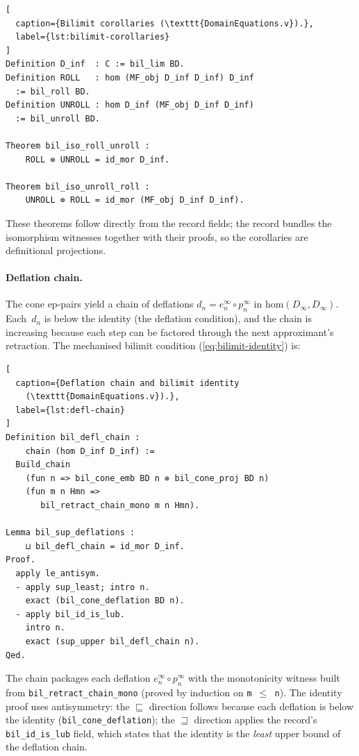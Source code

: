\begin{lstlisting}[
  caption={Bilimit corollaries (\texttt{DomainEquations.v}).},
  label={lst:bilimit-corollaries}
]
Definition D_inf  : C := bil_lim BD.
Definition ROLL   : hom (MF_obj D_inf D_inf) D_inf
  := bil_roll BD.
Definition UNROLL : hom D_inf (MF_obj D_inf D_inf)
  := bil_unroll BD.

Theorem bil_iso_roll_unroll :
    ROLL ⊚ UNROLL = id_mor D_inf.

Theorem bil_iso_unroll_roll :
    UNROLL ⊚ ROLL = id_mor (MF_obj D_inf D_inf).
\end{lstlisting}

These theorems follow directly from the record fields; the record
bundles the isomorphism witnesses together with their proofs,
so the corollaries are definitional projections.

\paragraph{Deflation chain.}
The cone ep-pairs yield a chain of deflations
$d_n = e^\infty_n \circ p^\infty_n$ in $\mathrm{hom}(D_\infty,
D_\infty)$.  Each~$d_n$ is below the identity (the deflation
condition), and the chain is increasing because each step can be
factored through the next approximant's retraction.  The mechanised
bilimit condition (\cref{eq:bilimit-identity}) is:

\begin{lstlisting}[
  caption={Deflation chain and bilimit identity
    (\texttt{DomainEquations.v}).},
  label={lst:defl-chain}
]
Definition bil_defl_chain :
    chain (hom D_inf D_inf) :=
  Build_chain
    (fun n => bil_cone_emb BD n ⊚ bil_cone_proj BD n)
    (fun m n Hmn =>
       bil_retract_chain_mono m n Hmn).

Lemma bil_sup_deflations :
    ⊔ bil_defl_chain = id_mor D_inf.
Proof.
  apply le_antisym.
  - apply sup_least; intro n.
    exact (bil_cone_deflation BD n).
  - apply bil_id_is_lub.
    intro n.
    exact (sup_upper bil_defl_chain n).
Qed.
\end{lstlisting}

The chain packages each deflation
$e^\infty_n \circ p^\infty_n$ with the monotonicity witness
built from \texttt{bil\_retract\_chain\_mono} (proved by induction
on \texttt{m $\le$ n}).  The identity proof uses antisymmetry: the
$\sqsubseteq$ direction follows because each deflation is below the
identity (\texttt{bil\_cone\_deflation}); the $\sqsupseteq$ direction
applies the record's \texttt{bil\_id\_is\_lub} field, which states
that the identity is the \emph{least} upper bound of the deflation chain.

